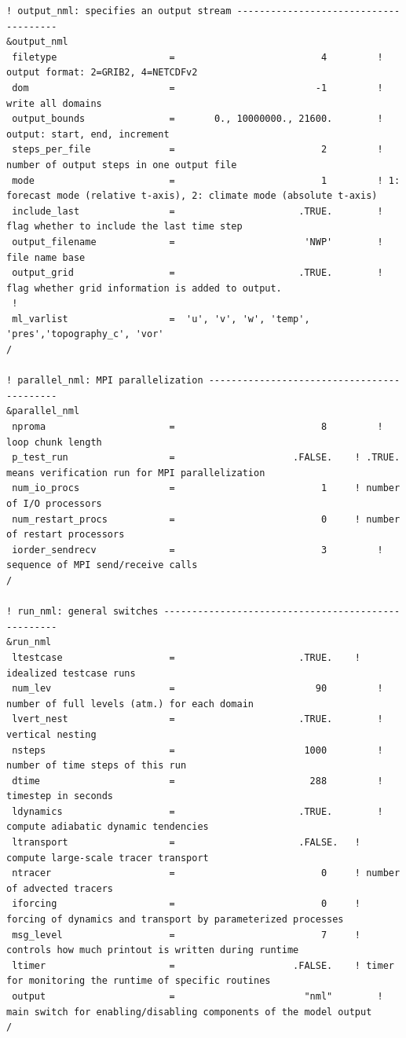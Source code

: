 \begin{landscape}
\begin{Verbatim}[frame=single]
! output_nml: specifies an output stream --------------------------------------
&output_nml
 filetype                    =                          4         ! output format: 2=GRIB2, 4=NETCDFv2
 dom                         =                         -1         ! write all domains
 output_bounds               =       0., 10000000., 21600.        ! output: start, end, increment
 steps_per_file              =                          2         ! number of output steps in one output file
 mode                        =                          1         ! 1: forecast mode (relative t-axis), 2: climate mode (absolute t-axis)
 include_last                =                      .TRUE.        ! flag whether to include the last time step
 output_filename             =                       'NWP'        ! file name base
 output_grid                 =                      .TRUE.        ! flag whether grid information is added to output.
 !
 ml_varlist                  =  'u', 'v', 'w', 'temp', 'pres','topography_c', 'vor'
/

! parallel_nml: MPI parallelization -------------------------------------------
&parallel_nml
 nproma                      =                          8         ! loop chunk length
 p_test_run                  =                     .FALSE.	  ! .TRUE. means verification run for MPI parallelization
 num_io_procs                =                          1	  ! number of I/O processors
 num_restart_procs           =                          0	  ! number of restart processors
 iorder_sendrecv             =                          3         ! sequence of MPI send/receive calls
/

! run_nml: general switches ---------------------------------------------------
&run_nml
 ltestcase                   =                      .TRUE.	  ! idealized testcase runs
 num_lev                     =                         90         ! number of full levels (atm.) for each domain
 lvert_nest                  =                      .TRUE.        ! vertical nesting
 nsteps                      =                       1000         ! number of time steps of this run
 dtime                       =                        288         ! timestep in seconds
 ldynamics                   =                      .TRUE.        ! compute adiabatic dynamic tendencies
 ltransport                  =                      .FALSE.	  ! compute large-scale tracer transport
 ntracer                     =                          0	  ! number of advected tracers
 iforcing                    =                          0	  ! forcing of dynamics and transport by parameterized processes
 msg_level                   =                          7	  ! controls how much printout is written during runtime
 ltimer                      =                     .FALSE.	  ! timer for monitoring the runtime of specific routines
 output                      =                       "nml"        ! main switch for enabling/disabling components of the model output
/


\end{Verbatim}
\end{landscape}
